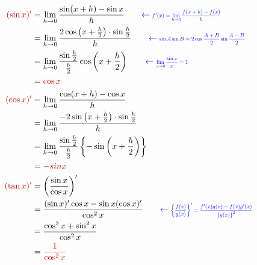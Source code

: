 \documentclass[../main]{subfiles}
\begin{document}
\begin{align*}
    \EMM{(\sin x)'} &= \lim_{h\to 0}\frac{\sin(x+h)-\sin x}{h}
    \qquad \EXPRNOTE{f'(x) = \lim_{h\to 0}\frac{f(x+h)-f(x)}{h}} \\
    &= \lim_{h\to 0}\frac{2\cos\left(x+\frac{h}{2}\right)\cdot\sin\frac{h}{2}}{h}
    \qquad \EXPRNOTE{\sin A\sin B = 2\cos\frac{A+B}{2}\sin\frac{A-B}{2}} \\
    &= \lim_{h\to 0}\frac{\sin\frac{h}{2}}{\frac{h}{2}}\cos\left(x+\frac{h}{2}\right)
    \qquad \EXPRNOTE{\lim_{x\to 0}\frac{\sin x}{x} = 1} \\
    &= \EMM{\cos x} \\
    \EMM{(\cos x)'} &= \lim_{h\to 0}\frac{\cos(x+h)-\cos x}{h} \\
    &= \lim_{h\to 0}\frac{-2\sin\left(x+\frac{h}{2}\right)\cdot\sin\frac{h}{2}}{h} \\
    &= \lim_{h\to 0}\frac{\sin\frac{h}{2}}{\frac{h}{2}}
    \left\{-\sin\left(x+\frac{h}{2}\right)\right\} \\
    &= \EMM{-sin x} \\
    \EMM{(\tan x)'} &= \left(\frac{\sin x}{\cos x}\right)' \\
    &= \frac{(\sin x)'\cos x - \sin x(\cos x)'}{\cos^2 x}
    \qquad \EXPRNOTE{
        \left\{
            \frac{f(x)}{g(x)}
        \right\}' = \frac{f'(x)g(x)-f(x)g'(x)}
        {\left\{g(x)\right\}^2}
    } \\
    &= \frac{\cos^2 x + \sin^2 x}{\cos^2 x} \\
    &= \EMM{\frac{1}{\cos^2 x}}
\end{align*}
\end{document}
